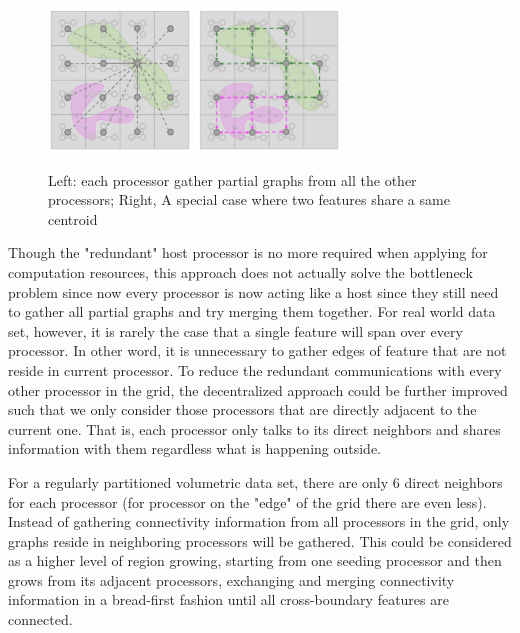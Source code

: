 \documentclass[10pt, conference, compsocconf]{IEEEtran}
\begin{document}
\begin{figure}[htpb]
\centering
\includegraphics[width=1.5in]{figure3.png}
\includegraphics[width=1.5in]{figure4.png}
\caption{Left: each processor gather partial graphs from all the other processors; Right, A special case where two features share a same centroid}
\end{figure}

Though the "redundant" host processor is no more required when applying for computation resources, this approach does not actually solve the bottleneck problem since now every processor is now acting like a host since they still need to gather all partial graphs and try merging them together. For real world data set, however, it is rarely the case that a single feature will span over every processor. In other word, it is unnecessary to gather edges of feature that are not reside in current processor. To reduce the redundant communications with every other processor in the grid, the decentralized approach could be further improved such that we only consider those processors that are directly adjacent to the current one. That is, each processor only talks to its direct neighbors and shares information with them regardless what is happening outside. 

For a regularly partitioned volumetric data set, there are only 6 direct neighbors for each processor (for processor on the "edge" of the grid there are even less). Instead of gathering connectivity information from all processors in the grid, only graphs reside in neighboring processors will be gathered. This could be considered as a higher level of region growing, starting from one seeding processor and then grows from its adjacent processors, exchanging and merging connectivity information in a bread-first fashion until all cross-boundary features are connected. 
\end{document}
